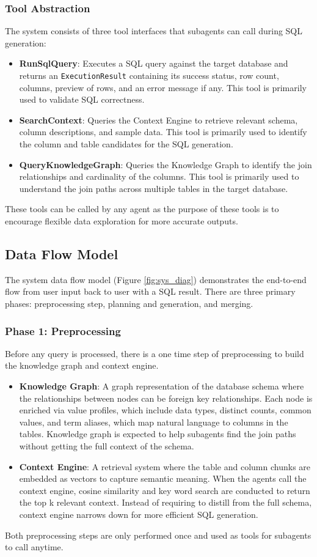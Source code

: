 \subsubsection{Tool Abstraction}
The system consists of three tool interfaces that subagents can call during SQL generation:
\begin{itemize}
    \item \textbf{RunSqlQuery}: Executes a SQL query against the target database and returns an \texttt{ExecutionResult} containing its success status, row count, columns, preview of rows, and an error message if any. This tool is primarily used to validate SQL correctness. 
    \item \textbf{SearchContext}: Queries the Context Engine to retrieve relevant schema, column descriptions, and sample data. This tool is primarily used to identify the column and table candidates for the SQL generation.
    \item \textbf{QueryKnowledgeGraph}: Queries the Knowledge Graph to identify the join relationships and cardinality of the columns. This tool is primarily used to understand the join paths across multiple tables in the target database.
\end{itemize}
These tools can be called by any agent as the purpose of these tools is to encourage flexible data exploration for more accurate outputs. 
\subsection{Data Flow Model}
The system data flow model (Figure \ref{fig:sys_diag}) demonstrates the end-to-end flow from user input back to user with a SQL result. There are three primary phases: preprocessing step, planning and generation, and merging.
\subsubsection{Phase 1: Preprocessing}
Before any query is processed, there is a one time step of preprocessing to build the knowledge graph and context engine.
\begin{itemize}
    \item \textbf{Knowledge Graph}: A graph representation of the database schema where the relationships between nodes can be foreign key relationships. Each node is enriched via value profiles, which include data types, distinct counts, common values, and term aliases, which map natural language to columns in the tables. Knowledge graph is expected to help subagents find the join paths without getting the full context of the schema.
    \item \textbf{Context Engine}: A retrieval system where the table and column chunks are embedded as vectors to capture semantic meaning. When the agents call the context engine, cosine similarity and key word search are conducted to return the top k relevant context. Instead of requiring to distill from the full schema, context engine narrows down for more efficient SQL generation.
\end{itemize}
Both preprocessing steps are only performed once and used as tools for subagents to call anytime. 
